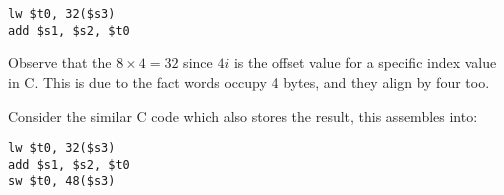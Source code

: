 \documentclass[11pt,a4paper,twocolumn]{book}
\begin{document}
\begin{lstlisting}
lw $t0, 32($s3)
add $s1, $s2, $t0
\end{lstlisting}

Observe that the $8 \times 4 = 32$ since $4i$ is the offset value for a specific index value in C. This is due to the fact words occupy 4 bytes, and they align by four too.

Consider the similar C code  which also stores the result, this assembles into:

\begin{lstlisting}
lw $t0, 32($s3)
add $s1, $s2, $t0
sw $t0, 48($s3)
\end{lstlisting}
\end{document}
